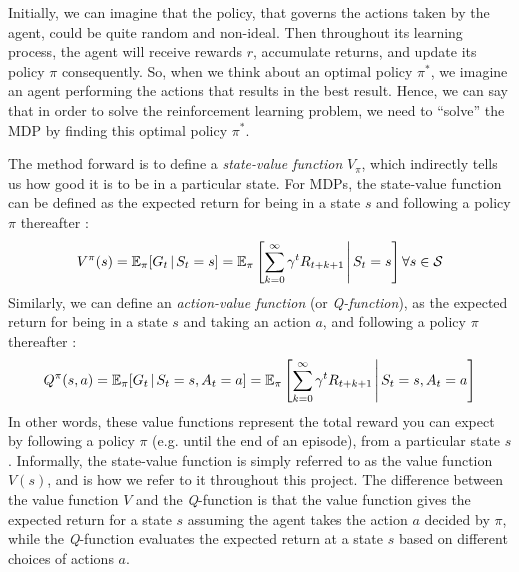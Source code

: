 Initially, we can imagine that the policy, that governs the actions taken by the agent, could be quite random and non-ideal. Then throughout its learning process, the agent will receive rewards $r$, accumulate returns, and update its policy $\pi$ consequently. So, when we think about an optimal policy $\pi^*$, we imagine an agent performing the actions that results in the best result.
Hence, we can say that in order to solve the reinforcement learning problem, we need to ``solve'' the MDP by finding this optimal policy $\pi^*$. 

The method forward is to define a \textit{state-value function} $V_\pi$, which indirectly tells us how good it is to be in a particular state. For MDPs, the state-value function can be defined as the expected return for being in a state $s$ and following a policy $\pi$ thereafter \cite{suttonAndBartoBook}:
\begin{equation}
    V^\pi(s) = \mathbb{E}_\pi [G_t \hspace{0.5mm} | \hspace{0.5mm} S_t = s] = \mathbb{E}_\pi \left[\sum^\infty_{k=0} \gamma^t R_{t+k+1} \hspace{0.5mm} \Bigg| \hspace{0.5mm} S_t = s \right] \forall s \in \mathcal{S}
\end{equation}
Similarly, we can define an \textit{action-value function} (or \textit{Q-function}), as the expected return for being in a state $s$ and taking an action $a$, and following a policy $\pi$ thereafter \cite{suttonAndBartoBook}:
\begin{equation}
    Q^\pi(s,a) = \mathbb{E}_\pi [G_t \hspace{0.5mm} | \hspace{0.5mm} S_t = s, A_t = a] = \mathbb{E}_\pi \left[\sum^\infty_{k=0} \gamma^t R_{t+k+1} \hspace{0.5mm} \Bigg| \hspace{0.5mm} S_t = s, A_t = a \right]
\end{equation}
In other words, these value functions represent the total reward you can expect by following a policy $\pi$ (e.g. until the end of an episode), from a particular state $s$. Informally, the state-value function is simply referred to as the value function $V(s)$, and is how we refer to it throughout this project. The difference between the value function $V$ and the \textit{Q}-function is that the value function gives the expected return for a state $s$ assuming the agent takes the action $a$ decided by $\pi$, while the \textit{Q}-function evaluates the expected return at a state $s$ based on different choices of actions $a$.

